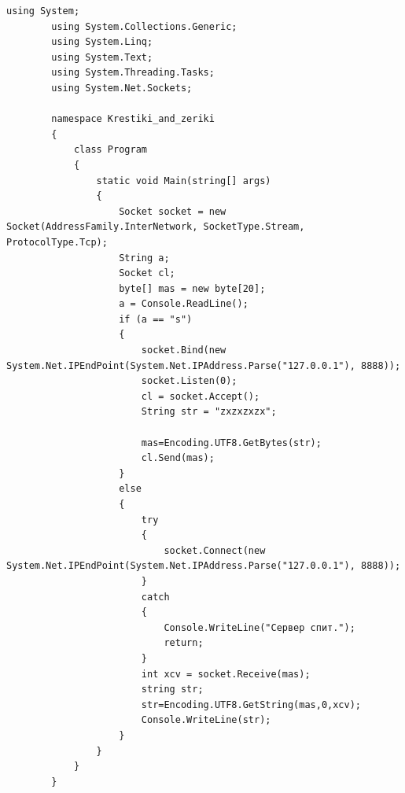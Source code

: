 \documentclass[a4paper, 12pt]{report}
\begin{document}
	\begin{lstlisting}[label=some-code,caption= Поиск основных состояний]
		using System;
		using System.Collections.Generic;
		using System.Linq;
		using System.Text;
		using System.Threading.Tasks;
		using System.Net.Sockets;
		
		namespace Krestiki_and_zeriki
		{
			class Program
			{
				static void Main(string[] args)
				{
					Socket socket = new Socket(AddressFamily.InterNetwork, SocketType.Stream, ProtocolType.Tcp);
					String a;
					Socket cl;
					byte[] mas = new byte[20];
					a = Console.ReadLine();
					if (a == "s")
					{
						socket.Bind(new System.Net.IPEndPoint(System.Net.IPAddress.Parse("127.0.0.1"), 8888));
						socket.Listen(0);
						cl = socket.Accept();
						String str = "zxzxzxzx";
						
						mas=Encoding.UTF8.GetBytes(str);
						cl.Send(mas);
					}
					else 
					{
						try
						{
							socket.Connect(new System.Net.IPEndPoint(System.Net.IPAddress.Parse("127.0.0.1"), 8888));
						}
						catch
						{
							Console.WriteLine("Сервер спит.");
							return;
						}
						int xcv = socket.Receive(mas);
						string str;
						str=Encoding.UTF8.GetString(mas,0,xcv);
						Console.WriteLine(str);
					}
				}
			}
		}
	\end{lstlisting}
	
	
	\printbibliography
	
\end{document}
